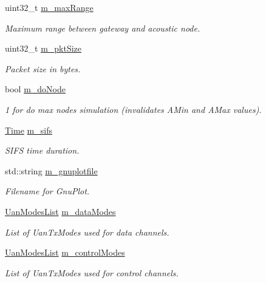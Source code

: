 \begin{DoxyCompactItemize}
uint32\+\_\+t \hyperlink{classExperiment_ae46d510ef227a0617af6b665c5ac3d9f}{m\+\_\+max\+Range}
\begin{DoxyCompactList}\small\item\em Maximum range between gateway and acoustic node. \end{DoxyCompactList}\item 
uint32\+\_\+t \hyperlink{classExperiment_ae73c947a54c222644fecfefd6d70b5a4}{m\+\_\+pkt\+Size}
\begin{DoxyCompactList}\small\item\em Packet size in bytes. \end{DoxyCompactList}\item 
bool \hyperlink{classExperiment_a7fe0a03d1eb287247ac02760bf3a3dd5}{m\+\_\+do\+Node}
\begin{DoxyCompactList}\small\item\em 1 for do max nodes simulation (invalidates A\+Min and A\+Max values). \end{DoxyCompactList}\item 
\hyperlink{classns3_1_1Time}{Time} \hyperlink{classExperiment_a4da00b956aa11609381dae2878c61bed}{m\+\_\+sifs}
\begin{DoxyCompactList}\small\item\em S\+I\+FS time duration. \end{DoxyCompactList}\item 
std\+::string \hyperlink{classExperiment_af7aa1ff58f32f02958b76e48bd2e3c6e}{m\+\_\+gnuplotfile}
\begin{DoxyCompactList}\small\item\em Filename for Gnu\+Plot. \end{DoxyCompactList}\item 
\hyperlink{classns3_1_1UanModesList}{Uan\+Modes\+List} \hyperlink{classExperiment_a4a7d5680962fc1018b9eaab99475db55}{m\+\_\+data\+Modes}
\begin{DoxyCompactList}\small\item\em List of Uan\+Tx\+Modes used for data channels. \end{DoxyCompactList}\item 
\hyperlink{classns3_1_1UanModesList}{Uan\+Modes\+List} \hyperlink{classExperiment_aba2da123b31bc2ceb2bc5a0470cc8d31}{m\+\_\+control\+Modes}
\begin{DoxyCompactList}\small\item\em List of Uan\+Tx\+Modes used for control channels. \end{DoxyCompactList}\end{DoxyCompactItemize}



